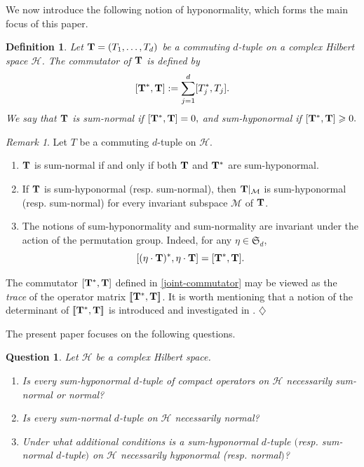\documentclass[10pt, a4paper, oneside, reqno]{amsproc}
\numberwithin{equation}{section}
\newtheorem{qst}[theorem]{Question}
\newtheorem{definition}[theorem]{Definition}
\theoremstyle{remark}
\newtheorem{remark}[theorem]{Remark}
\theoremstyle{definition}
\newcommand*{\Ge}{\geqslant}
\begin{document}
We now introduce the following notion of hyponormality, which forms the main focus of this paper.
\begin{definition} Let ${\bf T}=(T_1, \ldots, T_d)$ be a commuting $d$-tuple on a complex Hilbert space $\mathcal H$. The {\it commutator} of ${\bf T}$ is defined by
\begin{equation}
\label{joint-commutator}
[{\bf T^*}, {\bf T}] := \sum_{j=1}^d  [T^*_j, T_j].
\end{equation}
We say that 
${\bf T}$ is {\it sum-normal} if $[{\bf T^*}, {\bf T}] = 0,$ and {\it sum-hyponormal} if $[{\bf T^*}, {\bf T}] \Ge 0.$
\end{definition}
\begin{remark} \label{rem-1} 
Let $T$ be a commuting $d$-tuple on $\mathcal H.$ 
\begin{enumerate}
\item[(a)] ${\bf T}$ is sum-normal if and only if both ${\bf T}$ and ${\bf T^*}$ are sum-hyponormal.
\item[(b)] 
If ${\bf T}$ is sum-hyponormal (resp. sum-normal), then ${\bf T}|_{\mathcal M}$ is sum-hyponormal (resp. sum-normal) for every invariant subspace $\mathcal M$ of ${\bf T}$. 
\item[(c)] The notions of sum-hyponormality and sum-normality are invariant under the action of the permutation group. Indeed, for any $\eta \in {\mathfrak S}_d$, 
\begin{equation*} 
[(\eta \cdot {\bf T})^*, \eta \cdot {\bf T}]=[{\bf T}^*, {\bf T}]. 
\end{equation*}
\end{enumerate}
The commutator $[{\bf T}^*, {\bf T}]$ defined in \eqref{joint-commutator} may be viewed as the {\it trace} of the operator matrix $[\![{\bf T}^*, {\bf T}]\!]$. It is worth mentioning that a notion of the determinant of $[\![{\bf T}^*, {\bf T}]\!]$ is introduced and investigated in \cite{MPS2022}.
\hfill $\diamondsuit$
\end{remark}

The present paper focuses on the following questions.
\begin{qst} \label{Q1}
Let $\mathcal H$ be a complex Hilbert space. 
\begin{enumerate}
\item[(i)]  
Is every sum-hyponormal $d$-tuple of compact operators on $\mathcal H$ necessarily sum-normal or normal?
\item[(ii)] Is every sum-normal $d$-tuple on $\mathcal H$ necessarily normal? 
\item[(iii)] Under what additional conditions is a sum-hyponormal $d$-tuple $($resp. sum-normal $d$-tuple$)$ on $\mathcal H$ necessarily hyponormal (resp. normal$)$\!?
\end{enumerate}
\end{qst}
\end{document}
